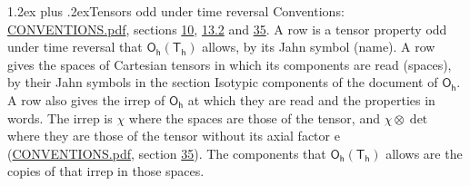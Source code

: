 \documentclass[10pt,a4paper]{article}
\makeatletter
\renewcommand\section{\@startsection{section}{1}{\z@}{-3ex plus -1ex minus -.2ex}%
  {1.2ex plus .2ex}{\normalfont\large\sffamily\bfseries\color{parttitle}}}
\numberwithin{equation}{section}
\newcommand{\grp}[1]{\mathsf{#1}}
\newcommand{\irrprod}{\otimes}
\makeatother
\begin{document}
\section{Tensors odd under time reversal}\label{s:time_odd}
Conventions: \href{../../CONVENTIONS.pdf}{CONVENTIONS.pdf}, sections \href{../../../rotation/CONVENTIONS.pdf\#conv.10}{10}, \href{../../../rotation/CONVENTIONS.pdf\#conv.13.2}{13.2} and \href{../../CONVENTIONS.pdf\#conv.35}{35}.
\leavevmode\label{n:head.name.property}A row is a tensor property odd under time reversal that $\grp{O_{h}}(\grp{T_{h}})$ allows, by its Jahn symbol (name). \label{n:head.spaces}A row gives the spaces of Cartesian tensors in which its components are read (spaces), by their Jahn symbols in the section Isotypic components of the document of \href{../../../rotation/data/pdf/Oh.pdf}{$\grp{O_{h}}$}. \label{n:head.properties}A row also gives the irrep of $\grp{O_{h}}$ at which they are read and the properties in words. The irrep is $\chi$ where the spaces are those of the tensor, and $\chi \irrprod \det$ where they are those of the tensor without its axial factor e (\href{../../CONVENTIONS.pdf}{CONVENTIONS.pdf}, section \href{../../CONVENTIONS.pdf\#conv.35}{35}). The components that $\grp{O_{h}}(\grp{T_{h}})$ allows are the copies of that irrep in those spaces.
\end{document}
